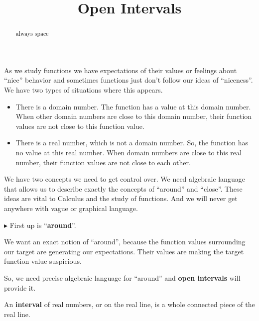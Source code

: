 \documentclass{ximera}
\title{Open Intervals}
\begin{document}
\begin{abstract}
always space
\end{abstract}
\maketitle




As we study functions we have expectations of their values or feelings about ``nice'' behavior and sometimes functions just don't follow our ideas of ``niceness''.  We have two types of situations where this appears.

\begin{itemize}
\item There is a domain number. The function has a value at this domain number. When other domain numbers are close to this domain number, their function values are not close to this function value.
\item There is a real number, which is not a domain number. So, the function has no value at this real number. When  domain numbers are close to this real number, their function values are not close to each other.
\end{itemize}


We have two concepts we need to get control over. We need algebraic language that allows us to describe exactly the concepts of ``around'' and ``close''.  These ideas are vital to Calculus and the study of functions.  And we will never get anywhere with vague or graphical language.


\textbf{\textcolor{red!90!darkgray}{$\blacktriangleright$}} First up is ``\textbf{\textcolor{purple!85!blue}{around}}''.



We want an exact notion of ``around'', because the function values surrounding our target are generating our expectations.  Their values are making the target function value suspicious.

So, we need precise algebraic language for ``around'' and \textbf{open intervals} will provide it.















An \textbf{interval} of real numbers, or on the real line, is a whole connected piece of the real line.
\end{document}
